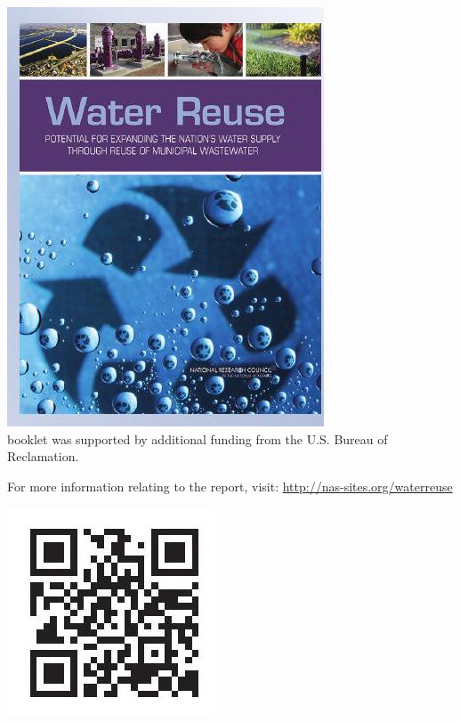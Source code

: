 \documentclass[10pt]{article}
\begin{document}
\includegraphics[max width=\textwidth]{2022_11_05_93277ca2de7ec5580550g-12}\\
booklet was supported by additional funding from the U.S. Bureau of Reclamation.

For more information relating to the report, visit: \href{http://nas-sites.org/waterreuse}{http://nas-sites.org/waterreuse}

\includegraphics[max width=\textwidth]{2022_11_05_93277ca2de7ec5580550g-12(1)}
\end{document}
